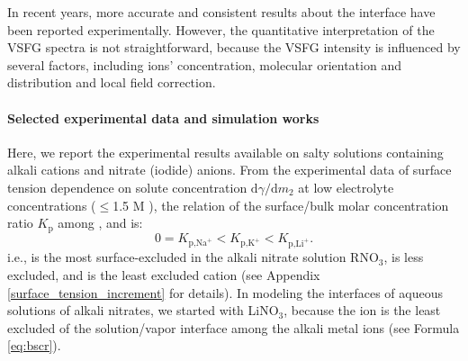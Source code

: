 In recent years, more accurate and consistent results about the interface have been reported experimentally\cite{TianCS2009,Shen2013}. 
However, the quantitative interpretation of the VSFG spectra is not straightforward, because the VSFG intensity is influenced by several factors, including ions' concentration, 
molecular orientation and distribution and local field correction\cite{Morita2008}.

\paragraph{Selected experimental data and simulation works}
Here, we report the experimental results available on salty solutions containing alkali cations and nitrate (iodide) anions\cite{PS03,AJ12,HuaWei2014}. 
From the experimental data of surface tension dependence on solute concentration $\text{d}\gamma/\text{d}m_2$ 
at low electrolyte concentrations ($\leq$1.5 M )\cite{Weissenborn1995,Hey1981,Jarvis1968,Jarvis1972}, 
the relation of the surface/bulk molar concentration ratio $K_{\text{p}}$\cite{Pegram2006} among \li, \Na and \K is: 
\begin{equation}
0=K_{\text{p,Na}^+}< K_{\text{p,K}^+}< K_{\text{p,Li}^+}.\label{eq:bscr}
\end{equation}
i.e., \Na is the most surface-excluded in the alkali nitrate solution RNO$_3$, \K is less excluded, 
and \Li is the least excluded cation (see Appendix \ref{surface_tension_increment} for details).
In modeling the interfaces of aqueous solutions of alkali nitrates, we started with LiNO$_3$, 
because the \Li ion is the least excluded of the solution/vapor interface among the alkali metal ions (see Formula \ref{eq:bscr}). 

